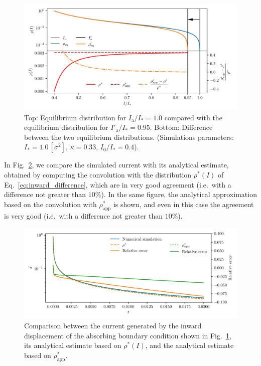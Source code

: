 \begin{figure}[htp]
    \centering
    \includegraphics[width=\textwidth]{4_probing_the_diffusive_behavior/figs/final/difference_backwards_s.pdf}
    \caption{Top: Equilibrium distribution for $I_\mathrm{a}/I_\ast = 1.0$ compared with the  equilibrium distribution for $I'_\mathrm{a}/I_\ast = 0.95$. Bottom: Difference between the two equilibrium distributions. (Simulations parameters: $I_\ast = 1.0\,[\sigma^2],\, \kappa = 0.33,\, I_0/I_\ast = 0.4$).}
    \label{fig:4}
\end{figure}

In Fig.~\ref{fig:5}, we compare the simulated current with its analytical estimate, obtained by computing the convolution with the distribution $\rho^\ast(I)$ of Eq.~\eqref{eq:inward_difference}, which are in very good agreement {(i.e.\ with a difference not greater than $10\%$)}. In the same figure, the analytical approximation based on the convolution with $\rho^\ast_\text{app}$ is shown, and even in this case the agreement is very good {(i.e.\ with a difference not greater than $10\%$)}.

\begin{figure}[htp]
    \centering
    \includegraphics[width=\textwidth]{4_probing_the_diffusive_behavior/figs/final/current_backwards.pdf}
    \caption{Comparison between the current generated by the inward displacement of the absorbing boundary condition shown in Fig.~\ref{fig:4}, its analytical estimate based on $\rho^\ast(I)$, and the analytical estimate based on $\rho^\ast_\text{app}$.}
    \label{fig:5}
\end{figure}

